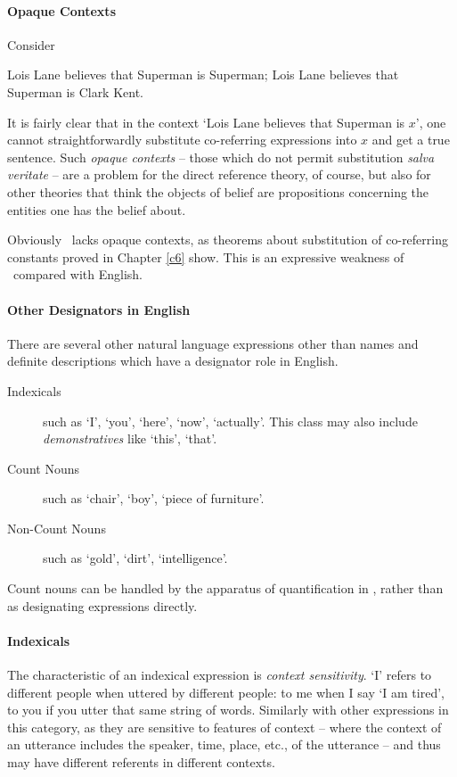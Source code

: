 \paragraph{Opaque Contexts}
 Consider \begin{exe}
	\ex Lois Lane believes that Superman is Superman;
	\ex Lois Lane believes that Superman is Clark Kent.
\end{exe}
It is fairly clear that in the context `Lois Lane believes that Superman is $x$', one cannot straightforwardly substitute co-referring expressions into $x$ and get a true sentence. Such \emph{opaque contexts} – those which do not permit substitution \emph{salva veritate} – are a problem for the direct reference theory, of course, but also for other theories that think the objects of belief are propositions concerning the entities one has the belief about. 

Obviously \ltwo\ lacks opaque contexts, as theorems about substitution of co-referring constants proved in Chapter \ref{c6} show. This is an expressive weakness of \ltwo\ compared with English.



\paragraph{Other Designators in English}
There are several other natural language expressions other than names and definite descriptions which have a designator role in English. \begin{description}
	\item [Indexicals] such as `I', `you', `here', `now', `actually'. This class may also include \emph{demonstratives} like `this', `that'.
	\item [Count Nouns] such as `chair', `boy', `piece of furniture'.
	\item [Non-Count Nouns] such as `gold', `dirt', `intelligence'.
\end{description}
Count nouns can be handled by the apparatus of quantification in \ltwo, rather than as designating expressions directly. 

\paragraph{Indexicals}
The characteristic of an indexical expression is \emph{context sensitivity}. `I' refers to different people when uttered by different people: to me when I say `I am tired', to you if you utter that same string of words. Similarly with other expressions in this category, as they are sensitive to features of context – where the context of an utterance includes the speaker, time, place, etc., of the utterance – and thus may have different referents in different contexts.

